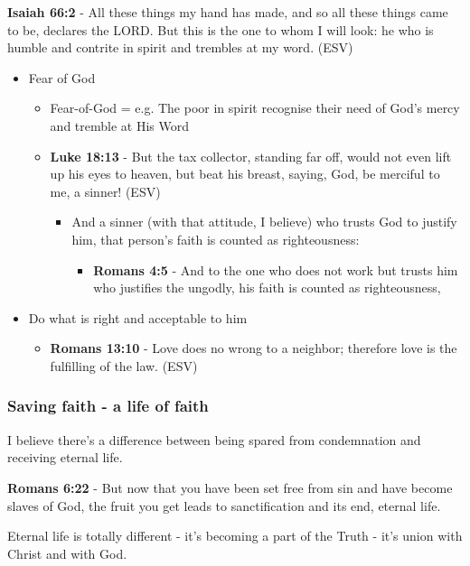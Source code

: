 \documentclass[11pt]{article}
\begin{document}
\textbf{Isaiah 66:2} - All these things my hand has made, and so all these things came to be, declares the LORD. But this is the one to whom I will look: he who is humble and contrite in spirit and trembles at my word. (ESV)

\begin{itemize}
\item Fear of God
\begin{itemize}
\item Fear-of-God = e.g. The poor in spirit recognise their need of God's mercy and tremble at His Word
\item \textbf{Luke 18:13} - But the tax collector, standing far off, would not even lift up his eyes to heaven, but beat his breast, saying, God, be merciful to me, a sinner! (ESV)
\begin{itemize}
\item And a sinner (with that attitude, I believe) who trusts God to justify him, that person's faith is counted as righteousness:
\begin{itemize}
\item \textbf{Romans 4:5} - And to the one who does not work but trusts him who justifies the ungodly, his faith is counted as righteousness,
\end{itemize}
\end{itemize}
\end{itemize}
\item Do what is right and acceptable to him
\begin{itemize}
\item \textbf{Romans 13:10} - Love does no wrong to a neighbor; therefore love is the fulfilling of the law. (ESV)
\end{itemize}
\end{itemize}

\subsubsection{Saving faith - a life of faith}
\label{sec:orgf761747}
I believe there's a difference between being spared from condemnation and receiving eternal life.

\textbf{Romans 6:22} - But now that you have been set free from sin and have become slaves of God, the fruit you get leads to sanctification and its end, eternal life.

Eternal life is totally different - it's becoming a part of the Truth - it's union with Christ and with God.
\end{document}
